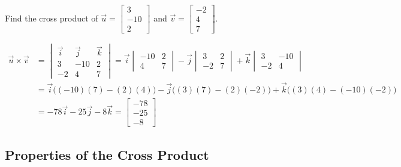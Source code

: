 \documentclass{ximera}
\begin{document}
\begin{example}\label{ex:crossproduct}
Find the cross product of $\vec{u}=\begin{bmatrix}3\\ -10\\ 2\end{bmatrix}$ and $\vec{v}=\begin{bmatrix}-2\\ 4\\ 7\end{bmatrix}$.
\begin{explanation}
\begin{align*}
\vec{u}\times \vec{v}&=
\begin{vmatrix}
\vec{i} & \vec{j} & \vec{k}\\
3 & -10 &2\\
-2 &4 &7
\end{vmatrix} =\vec{i}
\begin{vmatrix}
-10 & 2\\
4 & 7
\end{vmatrix} -\vec{j}
\begin{vmatrix}
3 & 2\\
-2 & 7
\end{vmatrix} +\vec{k}
\begin{vmatrix}
3 & -10\\
-2 & 4
\end{vmatrix}\\
&=\vec{i}\Big((-10)(7)-(2)(4)\Big)-\vec{j}\Big((3)(7)-(2)(-2)\Big)+\vec{k}\Big((3)(4)-(-10)(-2)\Big)\\
&=-78\vec{i}-25\vec{j}-8\vec{k}
=\begin{bmatrix}-78\\ -25\\ -8\end{bmatrix}
\end{align*}
\end{explanation}
\end{example}

\subsection*{Properties of the Cross Product}

\end{document}
